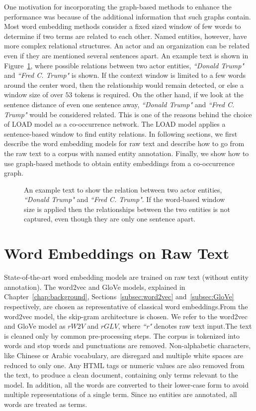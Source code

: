 One motivation for incorporating the graph-based methods to enhance the performance was because of the additional information that such graphs contain. Most word embedding methods consider a fixed sized window of few words to determine if two terms are related to each other. Named entities, however, have more complex relational structures. An actor and an organization can be related even if they are mentioned several sentences apart. An example text is shown in Figure~\ref{fig:article_entities}, where possible relations between  two actor entities, \emph{``Donald Trump"} and \emph{``Fred C. Trump"} is shown. If the context window is limited to a few words around the center word, then the relationship would remain detected, or else a window size of over $53$ tokens is required. On the other hand, if we look at the sentence distance of even one sentence away,  \emph{``Donald Trump"} and \emph{``Fred C. Trump"} would be considered related. This is one of the reasons behind the choice of LOAD model as a co-occurrence network. The LOAD model applies a sentence-based window to find entity relations. In following sections, we first describe the word embedding models for raw text and describe how to go from the raw text to a corpus with named entity annotation. Finally, we show how to use graph-based methods to obtain entity embeddings from a co-occurrence graph. 

\begin{figure}
\centering 
\resizebox{0.90\textwidth}{0.2\textwidth}{      

}
\caption{An example text to show the relation between two actor entities, \emph{``Donald Trump"} and \emph{``Fred C. Trump"}. If the word-based window size is applied then the relationships between the two entities is not captured, even though they are only one sentence apart. }
\label{fig:article_entities}
\end{figure}
\section{Word Embeddings on Raw Text}\label{sec:raw}
State-of-the-art word embedding models are trained on raw text (without entity annotation). The word2vec and GloVe models, explained in Chapter~\ref{chap:background}, Sections~\ref{subsec:word2vec} and~\ref{subsec:GloVe} respectively, are chosen as representative of classical word embeddings.From the word2vec model, the skip-gram architecture is chosen. We refer to the word2vec and GloVe model as $rW2V$ and  $rGLV$, where \emph{``r"} denotes raw text input.The text is cleaned only by common pre-processing steps. The corpus is tokenized into words and stop words and punctuations are removed. Non-alphabetic characters, like Chinese or Arabic vocabulary, are disregard and multiple white spaces are reduced to only one.  Any HTML tags or numeric values are also removed from the text, to produce a clean document, containing only terms relevant to the model. In addition, all the words are converted to their lower-case form to avoid multiple representations of a single term. Since no entities are annotated, all words are treated as terms. 
